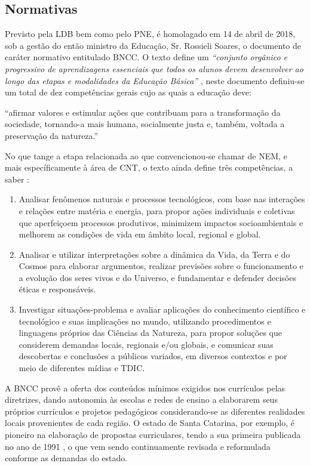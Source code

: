\subsection{Normativas} %
\label{sec:Referênciais normativos}
Previsto pela \ac{LDB} bem como pelo \ac{PNE}, é homolagado em 14 de abril de 2018, sob a gestão do então ministro da Educação, Sr. Rossieli Soares, o documento de caráter normativo entitulado \ac{BNCC}. O texto define um \textit{``conjunto orgânico e progressivo de aprendizagens essenciais que todos os alunos devem desenvolver ao longo das etapas e modalidades da Educação Básica''} \cite{BRASIL:2017}, neste documento definiu-se um total de dez competências gerais cujo as quais a educação deve:

\begin{citacao}
	``afirmar valores e estimular ações que contribuam para a transformação da sociedade, tornando-a mais humana, socialmente justa e, também, voltada a preservação da natureza.'' 
\end{citacao}

No que tange a etapa relacionada ao que convencionou-se chamar de \ac{NEM}, e mais específicamente à área de \ac{CNT}, o texto ainda define três competências, a saber :
\begin{enumerate}
	\item Analisar fenômenos naturais e processos tecnológicos, com base nas interações e relações entre matéria e energia, para propor ações individuais e coletivas que aperfeiçoem processos produtivos, minimizem impactos socioambientais e melhorem as condições de vida em âmbito local, regional e global.
	\item Analisar e utilizar interpretações sobre a dinâmica da Vida, da Terra e do Cosmos para elaborar argumentos, realizar previsões sobre o funcionamento e a evolução dos seres vivos e do Universo, e fundamentar e defender decisões éticas e responsáveis.
	\item Investigar situações-problema e avaliar aplicações do conhecimento científico e tecnológico e suas implicações no mundo, utilizando procedimentos e linguagens próprios das Ciências da Natureza, para propor soluções que considerem demandas locais, regionais e/ou globais, e comunicar suas descobertas e conclusões a públicos variados, em diversos contextos e por meio de diferentes mídias e \ac{TDIC}.
\end{enumerate}

A \ac{BNCC} provê a oferta dos conteúdos mínimos exigidos nos currículos pelas diretrizes, dando autonomia às escolas e redes de ensino a elaborarem seus próprios currículos e projetos pedagógicos considerando-se as diferentes realidades locais provenientes de cada região. O estado de Santa Catarina, por exemplo, é pioneiro na elaboração de propostas curriculares, tendo a sua primeira publicada no ano de 1991 \cite{CATARINA:1991}, o que vem sendo continuamente revisada e reformulada conforme as demandas do estado.

